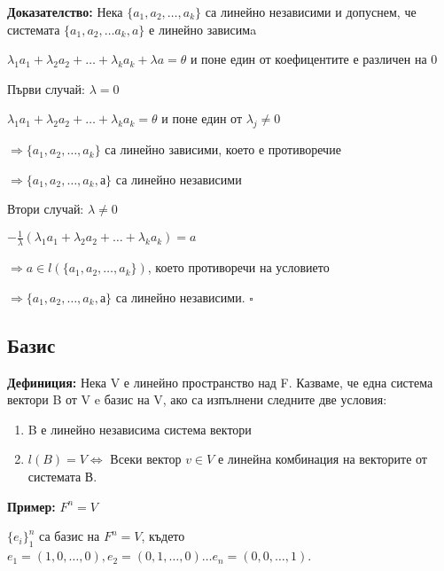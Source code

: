 \documentclass[fleqn,12pt]{article}
\begin{document}
\begin{flushleft}
\vspace{5mm}

\textbf{Доказателство:} Нека $\{a_1, a_2, \dots, a_k\} $ са линейно независими и допуснем, че системата $ \{a_1, a_2, \dots a_k, a \} $ е линейно зависимa

\vspace{5mm}

$ \lambda_1 a_1 + \lambda_2 a_2 + \dots + \lambda_k a_k + \lambda a = \theta $ и поне един от коефицентите е различен на 0

\vspace{5mm}

Първи случай: $\lambda = 0 $

$ \lambda_1 a_1 + \lambda_2 a_2 + \dots + \lambda_k a_k = \theta $ и поне един от $\lambda_j \neq 0 $

$ \Rightarrow \{a_1, a_2, \dots, a_k\} $ са линейно зависими, което е противоречие

$ \Rightarrow \{a_1, a_2, \dots, a_k, а\} $ са линейно независими

\vspace{5mm}

Втори случай: $\lambda \neq 0 $

$ - \frac{1}{\lambda} ( \lambda_1 a_1 + \lambda_2 a_2 + \dots + \lambda_k a_k ) = a $ 

$ \Rightarrow a \in l(\{a_1, a_2, \dots, a_k\}) $, което противоречи на условието

$ \Rightarrow \{a_1, a_2, \dots, a_k, а\} $ са линейно независими. $\square$


\subsection{Базис}
\textbf{Дефиниция:} Нека V е линейно пространство над F. Казваме, че една система вектори B от V e базис на V, ако са изпълнени следните две условия:

\begin{enumerate}
    \item B е линейно независима система вектори
    \item $l(B) = V \Leftrightarrow $ Всеки вектор $ v \in V $ е линейна комбинация на векторите от системата В.
\end{enumerate}

\textbf{Пример:} $ F^n = V $

$\{ e_i\}_1^n $ са базис на $ F^n = V $, където $ e_1 = (1, 0, \dots, 0), e_2 = (0, 1, \dots, 0) \dots e_n = (0, 0, \dots, 1)$.


\end{flushleft}
\end{document}
